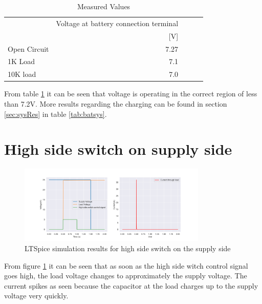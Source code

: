 
\begin{table}[!htb]
        \centering
        \footnotesize
        \caption{Measured Values}
         \begin{tabular}{lrrrr}
          \toprule
             & Voltage at battery connection terminal \\
             &  [V] \\
          \midrule
          Open Circuit & 7.27     \\
          1K Load &  7.1     \\
          10K load &  7.0     \\

          \bottomrule
        \end{tabular}
     \label{tab:regmeas}
\end{table}
From table \ref{tab:regmeas} it can be seen that voltage is operating in the correct region of less than 7.2V. More results regarding the charging can be found in section \ref{sec:sysRes} in table \ref{tab:batsys}.



 

\newpage
\section{High side switch on supply side}

\begin{figure}[!htb]
 \footnotesize
 \centering
\includegraphics[width=0.8\textwidth]{Figures/A1.png}
\caption{LTSpice simulation results for high side switch on the supply side}
\label{fig:high-res}
 \end{figure}
 
 From figure \ref{fig:high-res} it can be seen that as soon as the high side witch control signal goes high, the load voltage changes to approximately the supply voltage. The current spikes as seen because the capacitor at the load charges up to the supply voltage very quickly.

